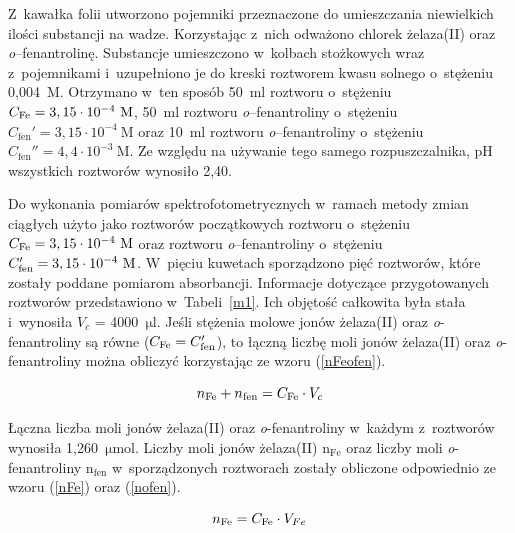 \documentclass[12pt]{article}
\begin{document}
Z~kawałka folii utworzono pojemniki przeznaczone do umieszczania niewielkich ilości substancji na wadze. Korzystając z~nich odważono
chlorek żelaza(II) oraz \textit{o}--fenantrolinę. Substancje umieszczono w~kolbach stożkowych wraz z~pojemnikami i~uzupełniono je do kreski roztworem kwasu solnego o~stężeniu 0,004~M. Otrzymano w~ten sposób 50~ml roztworu  o~stężeniu $C_{\ce{Fe}}= \mathrm{3,15 \cdot 10^{-4}~M}$, 50~ml roztworu \textit{o}--fenantroliny o~stężeniu $C_{\mathrm{fen}}' = \mathrm{3,15 \cdot 10^{-4}~M}$ oraz 10~ml roztworu \textit{o}--fenantroliny o~stężeniu $C_{\mathrm{fen}}'' = \mathrm{4,4 \cdot 10^{-3}~M}$. Ze względu na używanie tego samego rozpuszczalnika, pH wszystkich roztworów wynosiło 2,40.


Do wykonania pomiarów spektrofotometrycznych w~ramach metody zmian ciągłych użyto jako roztworów początkowych roztworu  o~stężeniu $C_{\ce{Fe}}= \mathrm{3,15 \cdot 10^{-4}~M}$ oraz roztworu \textit{o}--fenantroliny o~stężeniu $C_{\ce{fen}}'= \mathrm{3,15 \cdot 10^{-4}~M}$. W~pięciu kuwetach sporządzono pięć roztworów, które zostały poddane pomiarom absorbancji. Informacje dotyczące przygotowanych roztworów przedstawiono w~Tabeli~\ref{m1}. Ich objętość całkowita była stała i~wynosiła $V_c$ = 4000~$\mathrm{\mu l}$. Jeśli stężenia molowe jonów żelaza(II) oraz \textit{o}-fenantroliny są równe ($C_{\ce{Fe}}=C_{\ce{fen}}'$), to łączną liczbę moli jonów żelaza(II) oraz \textit{o}-fenantroliny można obliczyć korzystając ze wzoru (\ref{nFeofen}).

\begin{equation}
    n_{\mathrm{Fe}} + n_{\mathrm{fen}} = C_{\ce{Fe}} \cdot V_c
    \label{nFeofen}
\end{equation}

\noindent Łączna liczba moli jonów żelaza(II) oraz \textit{o}-fenantroliny w~każdym z~roztworów wynosiła 1,260~$\mathrm{\mu mol}$. Liczby moli jonów żelaza(II) $\mathrm{n_{Fe}}$ oraz liczby moli \textit{o}-fenantroliny $\mathrm{n_{fen}}$ w~sporządzonych roztworach zostały obliczone odpowiednio ze wzoru (\ref{nFe}) oraz (\ref{nofen}).

\begin{equation}
    n_{\mathrm{Fe}} = C_{\ce{Fe}} \cdot V_{Fe}
    \label{nFe}
\end{equation}
\end{document}
